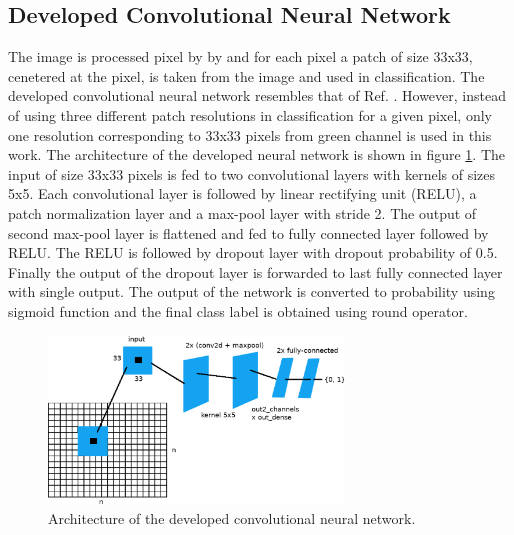 \documentclass[aps,prb,10pt,twocolumn,groupedaddress]{revtex4-1}
\begin{document}
\subsection{Developed Convolutional Neural Network}
\label{sec:computational_methods_developed_network}
The image is processed pixel by by and for each pixel a patch of size 33x33, cenetered at the pixel, is taken from the image and used in classification.
The developed convolutional neural network resembles that of Ref. \cite{tan}. However, instead of using three different patch resolutions in classification for a given pixel, only one resolution corresponding to 33x33 pixels from green channel is used in this work. The architecture of the developed neural network is shown in figure \ref{fig:net}. 
The input of size 33x33 pixels is fed to two convolutional layers with kernels of sizes 5x5. Each convolutional layer is followed by linear rectifying unit (RELU), a patch normalization layer and a max-pool layer with stride 2. The output of second max-pool layer is flattened and fed to fully connected layer followed by RELU. The RELU is followed by dropout layer with dropout probability of 0.5. Finally the output of the dropout layer is forwarded to last fully connected layer with single output. The output of the network is converted to probability using sigmoid function and the final class label is obtained using round operator.
\begin{figure}[!t]
	\centering
	\includegraphics[width=0.7\textwidth]{images/net_cropped.eps}
	\caption{Architecture of the developed convolutional neural network.}
	\label{fig:net}
\end{figure}
\end{document}
